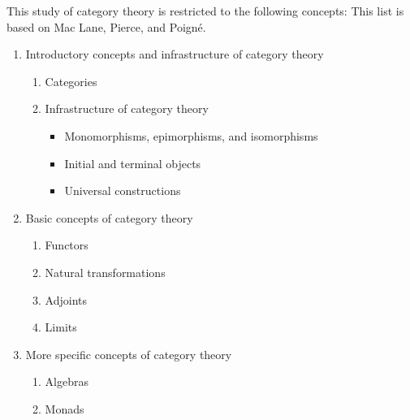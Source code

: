 This study of category theory is restricted to the following concepts:
This list is based on Mac Lane, Pierce, and Poigné.

\begin{enumerate}
\item Introductory concepts and infrastructure of category theory
  \begin{enumerate}
  \item Categories
  \item Infrastructure of category theory
    \begin{itemize}
    \item Monomorphisms, epimorphisms, and isomorphisms
    \item Initial and terminal objects
    \item Universal constructions
    \end{itemize}
  \end{enumerate}
\item Basic concepts of category theory
  \begin{enumerate}
  \item Functors
  \item Natural transformations
  \item Adjoints
  \item Limits
  \end{enumerate}
\item More specific concepts of category theory
  \begin{enumerate}
  \item Algebras
  \item Monads
  \end{enumerate}
\end{enumerate}

\clearemptydoublepage

